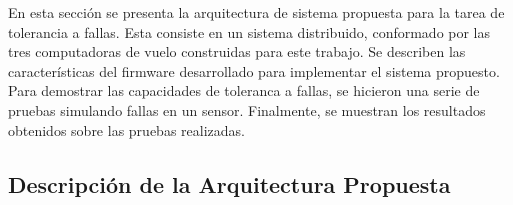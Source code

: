 
En esta sección se presenta la arquitectura de sistema propuesta para la tarea de tolerancia a fallas. Esta consiste en un sistema distribuido, conformado por las tres computadoras de vuelo construidas para este trabajo. Se describen las características del firmware desarrollado para implementar el sistema propuesto. Para demostrar las capacidades de toleranca a fallas, se hicieron una serie de pruebas simulando fallas en un sensor. Finalmente, se muestran los resultados obtenidos sobre las pruebas realizadas.












\subsection{Descripción de la Arquitectura Propuesta}

